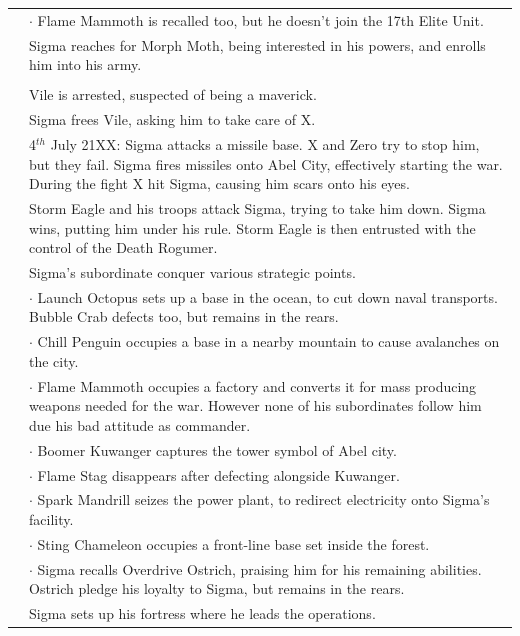 \begin{tabularx}{\linewidth}{l X}
	\tabline& $\cdot$ Flame Mammoth is recalled too, but he doesn't join the 17th Elite Unit.\\
	\tabdot&Sigma reaches for Morph Moth, being interested in his powers, and enrolls him into his army. \\
	\midrule
	\rowcolor{Aquamarine}
	\multicolumn{2}{c}{\textbf{Day of $\Sigma$ and beginning of the war}}\\
	\addlinespace[1.5ex]
	\tabdot& Vile is arrested, suspected of being a maverick.\\
	\tabdot& Sigma frees Vile, asking him to take care of X.\\
	\tabdot& 4$^{th}$ July 21XX: Sigma attacks a missile base. X and Zero try to stop him, but they fail. Sigma fires missiles onto Abel City, effectively starting the war. During the fight X hit Sigma, causing him scars onto his eyes.\\
	\tabdot& Storm Eagle and his troops attack Sigma, trying to take him down. Sigma wins, putting him under his rule. Storm Eagle is then entrusted with the control of the Death Rogumer.\\
	\tabdot& Sigma's subordinate conquer various strategic points.\\
	\tabline& $\cdot$ Launch Octopus sets up a base in the ocean, to cut down naval transports. Bubble Crab defects too, but remains in the rears.\\
	\tabline& $\cdot$ Chill Penguin occupies a base in a nearby mountain to cause avalanches on the city.\\
	\tabline& $\cdot$ Flame Mammoth occupies a factory and converts it for mass producing weapons needed for the war. However none of his subordinates follow him due his bad attitude as commander.\\
	\tabline& $\cdot$ Boomer Kuwanger captures the tower symbol of Abel city.\\
	\tabline& $\cdot$ Flame Stag disappears after defecting alongside Kuwanger.\\
	\tabline& $\cdot$ Spark Mandrill seizes the power plant, to redirect electricity onto Sigma's facility.\\
	\tabline& $\cdot$ Sting Chameleon occupies a front-line base set inside the forest.\\
	\tabline& $\cdot$ Sigma recalls Overdrive Ostrich, praising him for his remaining abilities. Ostrich pledge his loyalty to Sigma, but remains in the rears.\\
	\tabdot& Sigma sets up his fortress where he leads the operations.\\

\end{tabularx}
